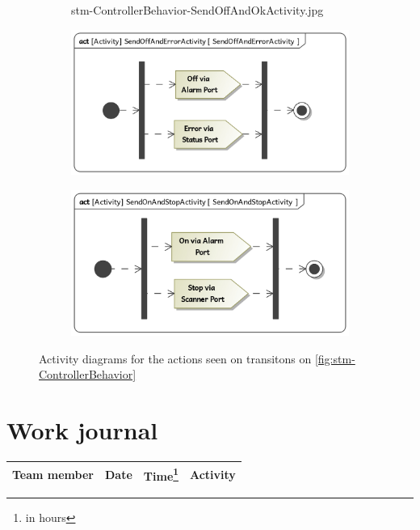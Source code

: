 \documentclass[a4paper]{article}
\begin{document}
\begin{figure}
\begin{subfigure}{.33\textwidth}
		{stm-ControllerBehavior-SendOffAndOkActivity.jpg}
	\end{subfigure}
	\begin{subfigure}{.33\textwidth}
		\includegraphics[width=\textwidth]
		{stm-ControllerBehavior-SendOffAndErrorActivity.jpg}
	\end{subfigure}
	\begin{subfigure}{.33\textwidth}
		\includegraphics[width=\textwidth]
		{stm-ControllerBehavior-SendOnAndStopActivity.jpg}
	\end{subfigure}
	\caption{Activity diagrams for the actions seen on transitons on
		\cref{fig:stm-ControllerBehavior}}%
	\label{fig:stm-ControllerBehavior-actions}
\end{figure}

\section{Work journal}

\begin{tabularx}{\textwidth}{l l l X}
	\toprule
	Team member & Date & Time\footnote{in hours} & Activity \\ \midrule

	\bottomrule
\end{tabularx}

\clearpage
\glsaddall
\printglossaries
\end{document}
